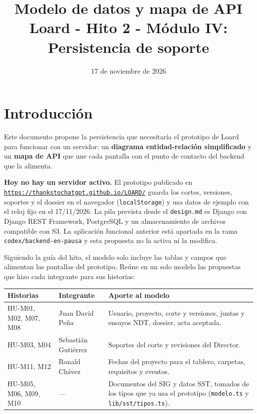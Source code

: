 \documentclass[11pt]{article}
\title{Modelo de datos y mapa de API\\[0.3em]
\large Loard - Hito 2 - Módulo IV: Persistencia de soporte}
\author{}
\date{17 de noviembre de 2026}
\newcommand{\urlapp}{https://thankstochatgpt.github.io/LOARD}
\begin{document}
\maketitle

\section{Introducción}

Este documento propone la persistencia que necesitaría el prototipo de Loard para funcionar con un servidor: un \textbf{diagrama entidad-relación simplificado} y un \textbf{mapa de API} que une cada pantalla con el punto de contacto del backend que la alimenta.

\textbf{Hoy no hay un servidor activo.} El prototipo publicado en \href{\urlapp/}{\nolinkurl{https://thankstochatgpt.github.io/LOARD/}} guarda los cortes, versiones, soportes y el dossier en el navegador (\texttt{localStorage}) y usa datos de ejemplo con el reloj fijo en el 17/11/2026. La pila prevista desde el \texttt{design.md} es Django con Django REST Framework, PostgreSQL y un almacenamiento de archivos compatible con S3. La aplicación funcional anterior está apartada en la rama \texttt{codex/backend-en-pausa} y esta propuesta no la activa ni la modifica.

Siguiendo la guía del hito, el modelo solo incluye las tablas y campos que alimentan las pantallas del prototipo. Reúne en un solo modelo las propuestas que hizo cada integrante para sus historias:

\begin{center}
\begin{tabular}{>{\raggedright\arraybackslash}p{3.8cm} >{\raggedright\arraybackslash}p{3.6cm} >{\raggedright\arraybackslash}p{8.2cm}}
\toprule
\textbf{Historias} & \textbf{Integrante} & \textbf{Aporte al modelo} \\ \midrule
HU-M01, M02, M07, M08 & Juan David Peña & Usuario, proyecto, corte y versiones, juntas y ensayos NDT, dossier, acta aceptada. \\
HU-M03, M04 & Sebastián Gutiérrez & Soportes del corte y revisiones del Director. \\
HU-M11, M12 & Ronald Chávez & Fechas del proyecto para el tablero, carpetas, requisitos y eventos. \\
HU-M05, M06, M09, M10 & --- & Documentos del SIG y datos SST, tomados de los tipos que ya usa el prototipo (\texttt{modelo.ts} y \texttt{lib/sst/tipos.ts}). \\
\bottomrule
\end{tabular}
\end{center}
\end{document}
